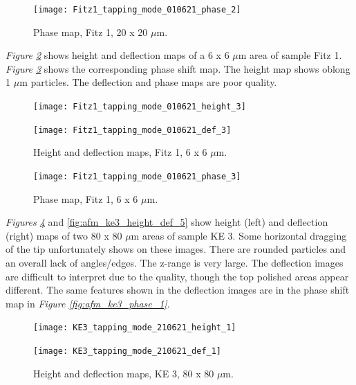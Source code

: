 \begin{figure}[H]
\centering
  \texttt{[image: Fitz1\_tapping\_mode\_010621\_phase\_2]}
\caption[Phase map, Fitz 1]{Phase map, Fitz 1, 20 x 20 $\mu$m.}
\label{fig:afm_fitz1_phase_2}
\end{figure}

\textit{Figure \ref{fig:afm_fitz1_height_def_3}} shows height and deflection maps of a 6 x 6 $\mu$m area of sample Fitz 1. \textit{Figure \ref{fig:afm_fitz1_phase_3}} shows the corresponding phase shift map. The height map shows oblong 1 $\mu$m particles. The deflection and phase maps are poor quality.

\begin{figure}[H]
\centering
\begin{minipage}{.45\textwidth}
  \centering
  \texttt{[image: Fitz1\_tapping\_mode\_010621\_height\_3]}
\end{minipage}
\begin{minipage}{.45\textwidth}
  \centering
  \texttt{[image: Fitz1\_tapping\_mode\_010621\_def\_3]}
\end{minipage}
\caption[Height and deflection maps, Fitz 1]{Height and deflection maps, Fitz 1, 6 x 6 $\mu$m.}
\label{fig:afm_fitz1_height_def_3}
\end{figure}

\begin{figure}[H]
\centering
  \texttt{[image: Fitz1\_tapping\_mode\_010621\_phase\_3]}
\caption[Phase map, Fitz 1]{Phase map, Fitz 1, 6 x 6 $\mu$m.}
\label{fig:afm_fitz1_phase_3}
\end{figure}


\textit{Figures \ref{fig:afm_ke3_height_def_1}} and \ref{fig:afm_ke3_height_def_5} show height (left) and deflection (right) maps of two 80 x 80 $\mu$m areas of sample KE 3. Some horizontal dragging of the tip unfortunately shows on these images. There are rounded particles and an overall lack of angles/edges. The z-range is very large. The deflection images are difficult to interpret due to the quality, though the top polished areas appear different. The same features shown in the deflection images are in the phase shift map in \textit{Figure \ref{fig:afm_ke3_phase_1}}.

\begin{figure}[H]
\centering
\begin{minipage}{.45\textwidth}
  \centering
  \texttt{[image: KE3\_tapping\_mode\_210621\_height\_1]}
\end{minipage}
\begin{minipage}{.45\textwidth}
  \centering
  \texttt{[image: KE3\_tapping\_mode\_210621\_def\_1]}
\end{minipage}
\caption[Height and deflection maps, KE 3]{Height and deflection maps, KE 3, 80 x 80 $\mu$m.}
\label{fig:afm_ke3_height_def_1}
\end{figure}

